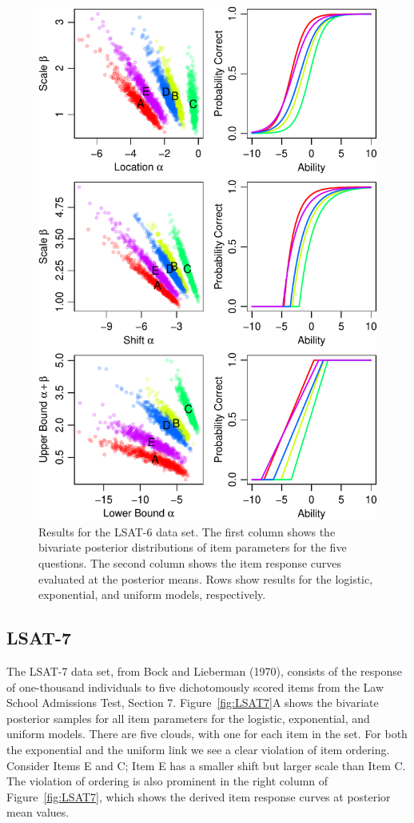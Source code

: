 \documentclass[english,,man]{apa6}
\begin{document}
\begin{figure}
\centering
\includegraphics{p_files/figure-latex/LSAT6-1.pdf}
\caption{\label{fig:LSAT6}Results for the LSAT-6 data set. The first column shows the bivariate posterior distributions of item parameters for the five questions. The second column shows the item response curves evaluated at the posterior means. Rows show results for the logistic, exponential, and uniform models, respectively.}
\end{figure}

\hypertarget{lsat-7}{%
\subsection{LSAT-7}\label{lsat-7}}

The LSAT-7 data set, from Bock and Lieberman (1970), consists of the response of one-thousand individuals to five dichotomously scored items from the Law School Admissions Test, Section 7. Figure~\ref{fig:LSAT7}A shows the bivariate posterior samples for all item parameters for the logistic, exponential, and uniform models. There are five clouds, with one for each item in the set. For both the exponential and the uniform link we see a clear violation of item ordering. Consider Items E and C; Item E has a smaller shift but larger scale than Item C. The violation of ordering is also prominent in the right column of Figure~\ref{fig:LSAT7}, which shows the derived item response curves at posterior mean values.
\end{document}
